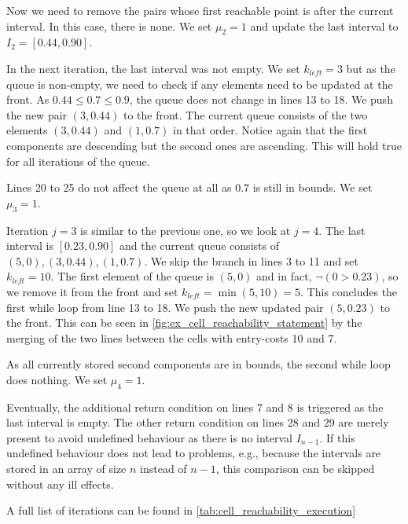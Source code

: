 Now we need to remove the pairs whose first reachable point is after the current interval. In this case, there is none. We set \(\mu_2 = 1\) and update the last interval to \(I_2 = [0.44, 0.90]\).

In the next iteration, the last interval was not empty. We set \(k_{left} = 3\) but as the queue is non-empty, we need to check if any elements need to be updated at the front. As \(0.44 \leq 0.7 \leq 0.9\), the queue does not change in lines 13 to 18. We push the new pair \((3, 0.44)\) to the front. The current queue consists of the two elements \((3, 0.44)\) and \((1, 0.7)\) in that order. Notice again that the first components are descending but the second ones are ascending. This will hold true for all iterations of the queue. 

Lines 20 to 25 do not affect the queue at all as \(0.7\) is still in bounds. We set \(\mu_3 = 1\). 

Iteration \(j = 3\) is similar to the previous one, so we look at \(j = 4\). The last interval is \([0.23, 0.90]\) and the current queue consists of \((5, 0), (3, 0.44), (1, 0.7)\). We skip the branch in lines 3 to 11 and set \(k_{left} = 10\). The first element of the queue is \((5, 0)\) and in fact, \(\lnot(0 > 0.23)\), so we remove it from the front and set \(k_{left} = \min(5, 10) = 5\). This concludes the first while loop from line 13 to 18. We push the new updated pair \((5, 0.23)\) to the front. This can be seen in \cref{fig:ex_cell_reachability_statement} by the merging of the two lines between the cells with entry-costs 10 and 7. 

As all currently stored second components are in bounds, the second while loop does nothing. We set \(\mu_4 = 1\).

Eventually, the additional return condition on lines 7 and 8 is triggered as the last interval is empty. The other return condition on lines 28 and 29 are merely present to avoid undefined behaviour as there is no interval \(I_{n-1}\). If this undefined behaviour does not lead to problems, e.g., because the intervals are stored in an array of size \(n\) instead of \(n-1\), this comparison can be skipped without any ill effects.

A full list of iterations can be found in \cref{tab:cell_reachability_execution}

